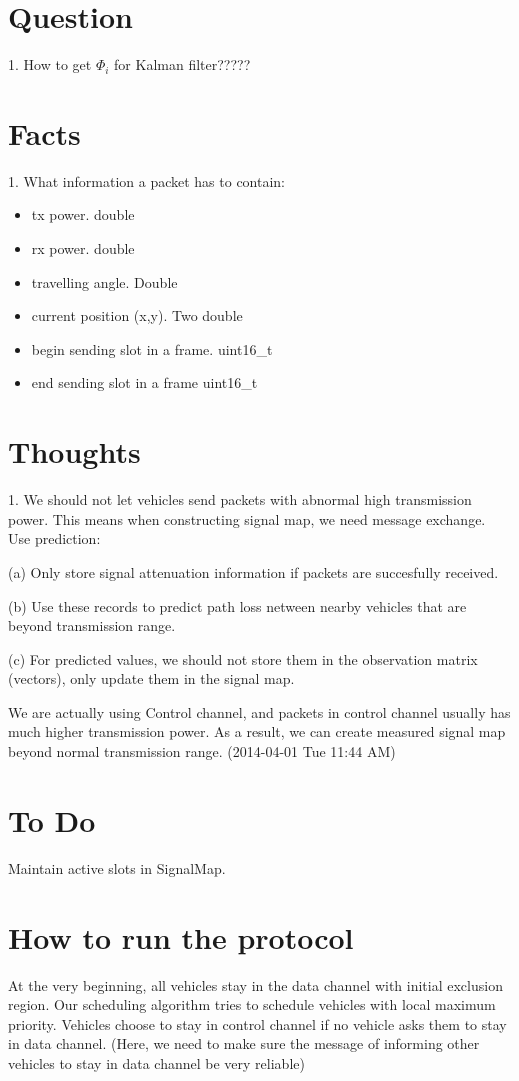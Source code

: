 \documentclass[10pt]{article}
\begin{document}
\section{Question}
1. How to get $\Phi_i$ for Kalman filter?????


\section {Facts}
1. What information a packet has to contain:
\begin{itemize}
  \item tx power. double
  \item rx power. double
  \item travelling angle. Double
  \item current position (x,y). Two double
  \item begin sending slot in a frame. uint16\_t
  \item end sending slot in a frame  uint16\_t
\end{itemize}

\section {Thoughts}
1. We should not let vehicles send packets with abnormal high transmission power. This means when constructing signal map, we need message exchange.  Use prediction:

(a) Only store signal attenuation information if packets are succesfully received. 

(b) Use these records to predict path loss netween nearby vehicles that are beyond transmission range.

(c) For predicted values, we should not store them in the observation matrix (vectors), only update them in the signal map.

We are actually using Control channel, and packets in control channel usually has much higher transmission power. As a result, we can create measured signal map beyond normal transmission range. (2014-04-01 Tue 11:44 AM)

\section{To Do}
Maintain active slots in SignalMap. 

\section{How to run the protocol}
At the very beginning, all vehicles stay in the data channel with initial exclusion region. Our scheduling algorithm tries to schedule vehicles with local maximum priority. 
Vehicles choose to stay in control channel if no vehicle asks them to stay in data channel. (Here, we need to make sure the message of informing other vehicles to stay in data channel be very reliable) 
\end{document}

